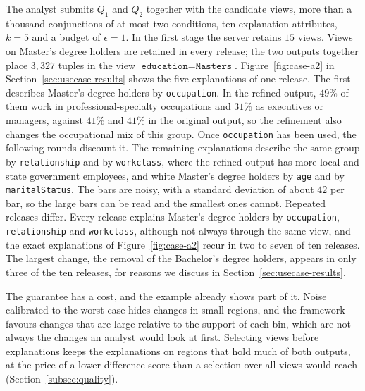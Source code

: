 \begin{example}
\label{ex:intro-output}
The analyst submits $Q_1$ and $Q_2$ together with the candidate views, more than a thousand conjunctions of at most two conditions, ten explanation attributes, $k=5$ and a budget of $\epsilon=1$.
In the first stage the server retains $15$ views.
Views on Master's degree holders are retained in every release; the two outputs together place $3{,}327$ tuples in the view $\texttt{education}=\texttt{Masters}$.
Figure~\ref{fig:case-a2} in Section~\ref{sec:usecase-results} shows the five explanations of one release.
The first describes Master's degree holders by \texttt{occupation}.
In the refined output, $49\%$ of them work in professional-specialty occupations and $31\%$ as executives or managers, against $41\%$ and $41\%$ in the original output, so the refinement also changes the occupational mix of this group.
Once \texttt{occupation} has been used, the following rounds discount it.
The remaining explanations describe the same group by \texttt{relationship} and by \texttt{workclass}, where the refined output has more local and state government employees, and white Master's degree holders by \texttt{age} and by \texttt{maritalStatus}.
The bars are noisy, with a standard deviation of about $42$ per bar, so the large bars can be read and the smallest ones cannot.
Repeated releases differ.
Every release explains Master's degree holders by \texttt{occupation}, \texttt{relationship} and \texttt{workclass}, although not always through the same view, and the exact explanations of Figure~\ref{fig:case-a2} recur in two to seven of ten releases.
The largest change, the removal of the Bachelor's degree holders, appears in only three of the ten releases, for reasons we discuss in Section~\ref{sec:usecase-results}.
\end{example}

The guarantee has a cost, and the example already shows part of it.
Noise calibrated to the worst case hides changes in small regions, and the framework favours changes that are large relative to the support of each bin, which are not always the changes an analyst would look at first.
Selecting views before explanations keeps the explanations on regions that hold much of both outputs, at the price of a lower difference score than a selection over all views would reach (Section~\ref{subsec:quality}).

